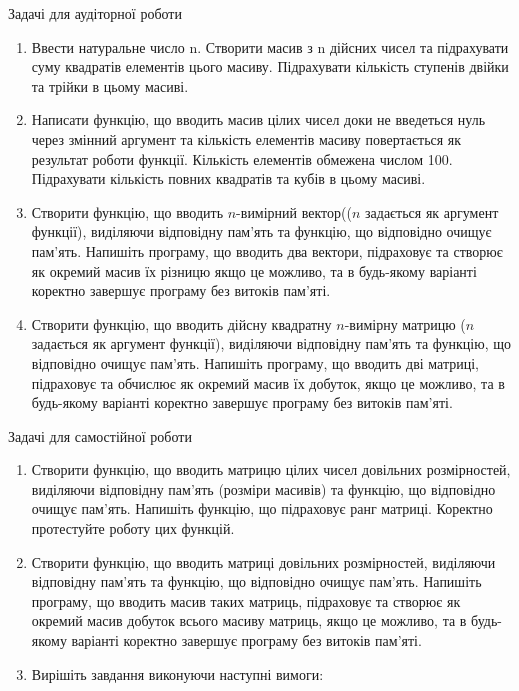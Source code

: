\documentclass[]{article}
\makeatletter
\newcommand{\xslalph}[1]{\expandafter\@xslalph\csname c@#1\endcsname}
\newcommand{\@xslalph}[1]{%
    \ifcase#1\or а\or б\or в\or г\or д\or e\or є\or ж\or з\or i%
    \or й\or к\or л\or м\or н\or о\or п\or р\or с\or т%
    \or у\or ф\or х\or ц\or ч\or ш\or ю\or я\or аа\or бб\or вв%
    \else\@ctrerr\fi%
}
\makeatother
\begin{document}
\begin{enumerate}
\begin{enumerate}[label=\xslalph*)]
\begin{enumerate}
\begin{enumerate}[label=\xslalph*)]
Задачі для аудіторної роботи

\begin{enumerate}
\def\labelenumi{\arabic{enumi})}
\item
  Ввести натуральне число n. Створити масив з n дійсних чисел та
  підрахувати суму квадратів елементів цього масиву. Підрахувати
  кількість ступенів двійки та трійки в цьому масиві.

\item
  Написати функцію, що вводить масив цілих чисел доки не введеться нуль
  через змінний аргумент та кількість елементів масиву повертається як
  результат роботи функції. Кількість елементів обмежена числом 100.
  Підрахувати кількість повних квадратів та кубів в цьому масиві.
\item
  Створити функцію, що вводить $n$-вимірний вектор(($n$
  задається як аргумент функції), виділяючи відповідну
  пам'ять та функцію, що відповідно очищує пам'ять. Напишіть програму,
  що вводить два вектори, підраховує та створює як окремий масив їх
  різницю якщо це можливо, та в будь-якому варіанті коректно
  завершує програму без витоків пам'яті.
\item
  Створити функцію, що вводить дійсну квадратну $n$-вимірну матрицю ($n$
  задається як аргумент функції), виділяючи відповідну пам'ять та
  функцію, що відповідно очищує пам'ять. Напишіть програму, що вводить
  дві матриці, підраховує та обчислює як окремий масив їх добуток, якщо
  це можливо, та в будь-якому варіанті коректно завершує програму без
  витоків пам'яті.
\end{enumerate}

Задачі для самостійної роботи

\begin{enumerate}
\def\labelenumi{\arabic{enumi})}
\setcounter{enumi}{4}
\item
  Створити функцію, що вводить матрицю цілих чисел довільних
  розмірностей, виділяючи відповідну пам'ять (розміри масивів) та
  функцію, що відповідно очищує пам'ять. Напишіть функцію, що підраховує
  ранг матриці. Коректно протестуйте роботу цих функцій.
\item
  Створити функцію, що вводить матриці довільних розмірностей, виділяючи
  відповідну пам'ять та функцію, що відповідно очищує пам'ять. Напишіть
  програму, що вводить масив таких матриць, підраховує та створює як
  окремий масив добуток всього масиву матриць, якщо це можливо, та в
  будь-якому варіанті коректно завершує програму без витоків пам'яті.
\item
  Вирішіть завдання виконуючи наступні вимоги:


\end{enumerate}
\end{enumerate}
\end{enumerate}
\end{enumerate}
\end{enumerate}
\end{document}
